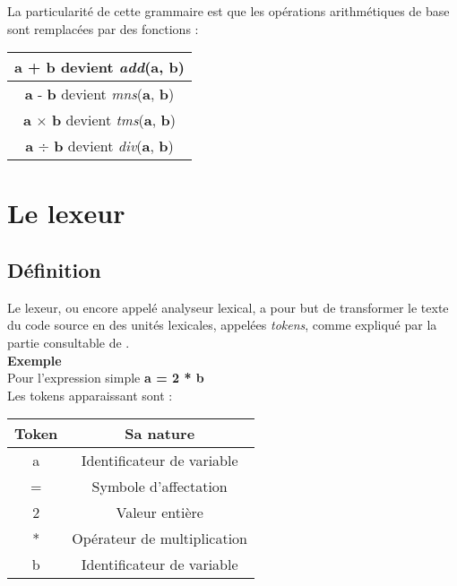 \documentclass[a4paper]{article}
\begin{document}
La particularité de cette grammaire est que les opérations arithmétiques de base sont remplacées par des fonctions :\\
\begin{center}
\begin{tabular}{ | c | }
    \hline
    \textbf{a} + \textbf{b} devient \textit{add}(\textbf{a}, \textbf{b})\\
    \hline
    \textbf{a} - \textbf{b} devient \textit{mns}(\textbf{a}, \textbf{b})\\
    \hline
    \textbf{a} $\times$ \textbf{b} devient \textit{tms}(\textbf{a}, \textbf{b})\\
    \hline
    \textbf{a} $\div$ \textbf{b} devient \textit{div}(\textbf{a}, \textbf{b})\\
    \hline
\end{tabular}
\end{center}


\clearpage{}


\section{Le lexeur}

\subsection{Définition}

 Le lexeur, ou encore appelé analyseur lexical, a pour but de transformer le texte du code source en des unités lexicales, appelées \textit{tokens}, comme expliqué par la partie consultable de  \cite{flexBisonHandbook}. \\
 
\textbf{Exemple} \\
    Pour l'expression simple \textbf{a = 2 * b} \\
    Les tokens apparaissant sont : \\
    \begin{center}
    \begin{tabular}{ | c | c | }
    \hline
    \textbf{Token} & \textbf{Sa nature} \\ 
    \hline
    a & Identificateur de variable \\ 
    \hline
    = & Symbole d'affectation \\  
    \hline
    2 & Valeur entière \\
    \hline
    * & Opérateur de multiplication \\
    \hline
    b & Identificateur de variable \\
    \hline
\end{tabular}
\end{center}
\end{document}
